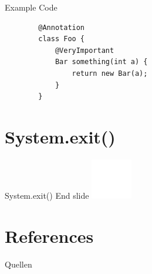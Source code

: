 \documentclass[final, ngerman, xcolor=pdftex, dvipsnames, table, aspectratio=169, 14pt]{beamer}
\begin{document}
\begin{frame}[fragile]{Example Code}
    \large\begin{verbatim}
        @Annotation
        class Foo {
            @VeryImportant
            Bar something(int a) {
                return new Bar(a);
            }
        }
    \end{verbatim}
\end{frame}

\section*{System.exit()}

\begin{frame}{System.exit()}
  \Large End slide
  \includegraphics{pictures/GitHub-Mark}
\end{frame}

\section*{References}
\begin{frame}[allowframebreaks]{Quellen}
  \nocite{web.daggerdoc}
  \nocite{web.postDagger2}
  \small
  
  
\end{frame}
\end{document}
